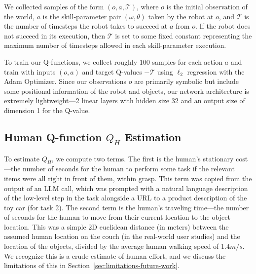 We collected samples of the form $(o, a, \mathcal{T})$, where $o$ is the initial observation of the world, $a$ is the skill-parameter pair $(\omega, \theta)$ taken by the robot at $o$, and $\mathcal{T}$ is the number of timesteps the robot takes to succeed at $a$ from $o$. If the robot does not succeed in its execution, then $\mathcal{T}$ is set to some fixed constant representing the maximum number of timesteps allowed in each skill-parameter execution.

To train our Q-functions, we collect roughly 100 samples for each action $a$ and train with inputs $(o, a)$ and target Q-values $-\mathcal{T}$ using $\ell_2$ regression with the Adam Optimizer. Since our observations $o$ are primarily symbolic but include some positional information of the robot and objects, our network architecture is extremely lightweight---2 linear layers with hidden size 32 and an output size of dimension 1 for the Q-value.

\subsection*{Human Q-function $Q_{H}$ Estimation}
To estimate $Q_{H}$, we compute two terms. The first is the human's stationary cost---the number of seconds for the human to perform some task if the relevant items were all right in front of them, within grasp. This term was copied from the output of an LLM call, which was prompted with a natural language description of the low-level step in the task alongside a URL to a product description of the toy car (for task 2). The second term is the human's traveling time---the number of seconds for the human to move from their current location to the object location. This was a simple 2D euclidean distance (in meters) between the assumed human location on the couch (in the real-world user studies) and the location of the objects, divided by the average human walking speed of $1.4 m/s$. We recognize this is a crude estimate of human effort, and we discuss the limitations of this in Section~\ref{sec:limitations-future-work}.

